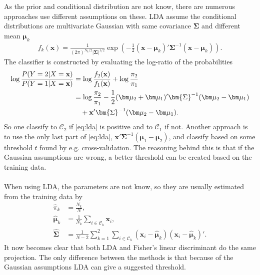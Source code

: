 As the prior and conditional distribution are not know, there are numerous approaches use different assumptions on these. LDA assume the conditional distributions are multivariate Gaussian with same covariance $\bm{\Sigma}$ and different mean $\bm\mu_k$
\begin{align}
  f_k(\mathbf{x}) =  \frac{1}{(2\pi)^{N_k/2}|\bm{\Sigma}|^{1/2}} \exp\left( -\frac{1}{2} (\mathbf{x}-\bm \mu_k)' \bm{\Sigma}^{-1} (\mathbf{x}-\bm \mu_k)\right).
\end{align}
The classifier is constructed by evaluating the log-ratio of the probabilities
\begin{align}
  \label{eq:lda} 
  \log{\frac{P(Y=2|X=\mathbf{x})}{P(Y=1|X=\mathbf{x})}} &= \log{\frac{f_2(\mathbf{x})}{f_1(\mathbf{x})} } + \log{\frac{\pi_2}{\pi_1} } \notag \ \\
  &= \log{\frac{\pi_2}{\pi_1}} -\frac{1}{2} (\bm \mu_2+\bm \mu_1)' \bm{\Sigma}^{-1} (\bm \mu_2-\bm \mu_1) \\
  & \quad + \mathbf{x}'\bm{\Sigma}^{-1} (\bm \mu_2-\bm \mu_1).
  \notag \ 
\end{align}
So one classify to $\mathcal{C}_2$ if \eqref{eq:lda} is positive and to $\mathcal{C}_1$ if not. Another approach is to use the only last part of \eqref{eq:lda}, $\mathbf{x}'\bm{\Sigma}^{-1} (\bm \mu_1-\bm \mu_2)$, and classify based on some threshold $t$ found by e.g. cross-validation. The reasoning behind this is that if the Gaussian assumptions are wrong, a better threshold can be created based on the training data. \\
\\
When using LDA, the parameters are not know, so they are usually estimated from the training data by
\begin{align}
   \hat{\pi}_k &= \frac{N_k}{N},  \\
   \hat{\bm \mu}_k &= \frac{1}{N_k} \sum_{i \in \mathcal{C}_k}\mathbf{x}_i, \\
   \hat{\bm \Sigma} &= \frac{1}{N-2} \sum_{k = 1}^{2} \sum_{i \in \mathcal{C}_k}(\mathbf{x}_i - \hat{\bm{\mu}}_k)(\mathbf{x}_i - \hat{\bm{\mu}}_k)'.
\end{align}
It now becomes clear that both LDA and Fisher's linear discriminant do the same projection. The only difference between the methods is that because of the Gaussian assumptions LDA can give a suggested threshold.
%

